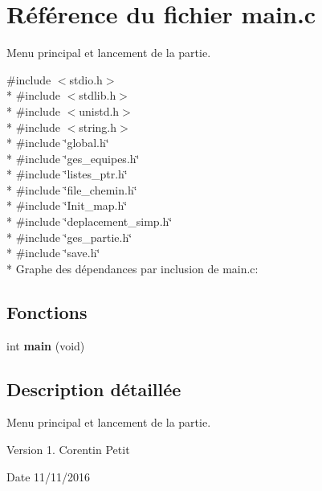 \hypertarget{a00009}{}\section{Référence du fichier main.\+c}
\label{a00009}


Menu principal et lancement de la partie.  


{\ttfamily \#include $<$stdio.\+h$>$}\\*
{\ttfamily \#include $<$stdlib.\+h$>$}\\*
{\ttfamily \#include $<$unistd.\+h$>$}\\*
{\ttfamily \#include $<$string.\+h$>$}\\*
{\ttfamily \#include \char`\"{}global.\+h\char`\"{}}\\*
{\ttfamily \#include \char`\"{}ges\+\_\+equipes.\+h\char`\"{}}\\*
{\ttfamily \#include \char`\"{}listes\+\_\+ptr.\+h\char`\"{}}\\*
{\ttfamily \#include \char`\"{}file\+\_\+chemin.\+h\char`\"{}}\\*
{\ttfamily \#include \char`\"{}Init\+\_\+map.\+h\char`\"{}}\\*
{\ttfamily \#include \char`\"{}deplacement\+\_\+simp.\+h\char`\"{}}\\*
{\ttfamily \#include \char`\"{}ges\+\_\+partie.\+h\char`\"{}}\\*
{\ttfamily \#include \char`\"{}save.\+h\char`\"{}}\\*
Graphe des dépendances par inclusion de main.\+c\+:
\subsection*{Fonctions}
\begin{DoxyCompactItemize}
\item 
int {\bfseries main} (void)\hypertarget{a00009_a840291bc02cba5474a4cb46a9b9566fe}{}\label{a00009_a840291bc02cba5474a4cb46a9b9566fe}

\end{DoxyCompactItemize}


\subsection{Description détaillée}
Menu principal et lancement de la partie. 

\begin{DoxyVersion}{Version}
1.  Corentin Petit 
\end{DoxyVersion}
\begin{DoxyDate}{Date}
11/11/2016 
\end{DoxyDate}
